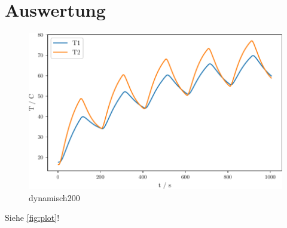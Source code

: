 \section{Auswertung}
\label{sec:Auswertung}

\begin{figure}
  \centering
  \includegraphics{build/dynamisch200.pdf}
  \caption{dynamisch200}
  \label{fig:plot}
\end{figure}


Siehe \autoref{fig:plot}!
